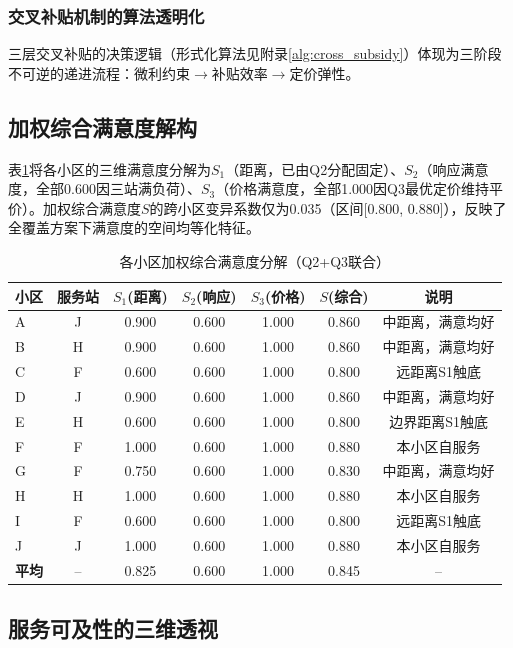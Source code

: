 \subsubsection{交叉补贴机制的算法透明化}

三层交叉补贴的决策逻辑（形式化算法见附录\ref{alg:cross_subsidy}）体现为三阶段不可逆的递进流程：微利约束$\to$补贴效率$\to$定价弹性。

\subsection{加权综合满意度解构}

表\ref{tab:q3_satisfaction}将各小区的三维满意度分解为$S_1$（距离，已由Q2分配固定）、$S_2$（响应满意度，全部0.600因三站满负荷）、$S_3$（价格满意度，全部1.000因Q3最优定价维持平价）。加权综合满意度$S$的跨小区变异系数仅为0.035（区间[0.800, 0.880]），反映了全覆盖方案下满意度的空间均等化特征。

\begin{table}[htbp]
\centering
\caption{各小区加权综合满意度分解（Q2+Q3联合）}
\label{tab:q3_satisfaction}
\begin{tabular}{lcccccc}
\toprule
\textbf{小区} & \textbf{服务站} & $S_1$(距离) & $S_2$(响应) & $S_3$(价格) & $S$(综合) & \textbf{说明} \\
\midrule
A & J & 0.900 & 0.600 & 1.000 & 0.860 & 中距离，满意均好 \\
B & H & 0.900 & 0.600 & 1.000 & 0.860 & 中距离，满意均好 \\
C & F & 0.600 & 0.600 & 1.000 & 0.800 & 远距离S1触底 \\
D & J & 0.900 & 0.600 & 1.000 & 0.860 & 中距离，满意均好 \\
E & H & 0.600 & 0.600 & 1.000 & 0.800 & 边界距离S1触底 \\
F & F & 1.000 & 0.600 & 1.000 & 0.880 & 本小区自服务 \\
G & F & 0.750 & 0.600 & 1.000 & 0.830 & 中距离，满意均好 \\
H & H & 1.000 & 0.600 & 1.000 & 0.880 & 本小区自服务 \\
I & F & 0.600 & 0.600 & 1.000 & 0.800 & 远距离S1触底 \\
J & J & 1.000 & 0.600 & 1.000 & 0.880 & 本小区自服务 \\
\midrule
\textbf{平均} & -- & 0.825 & 0.600 & 1.000 & 0.845 & -- \\
\bottomrule
\end{tabular}
\end{table}

\subsection{服务可及性的三维透视}

